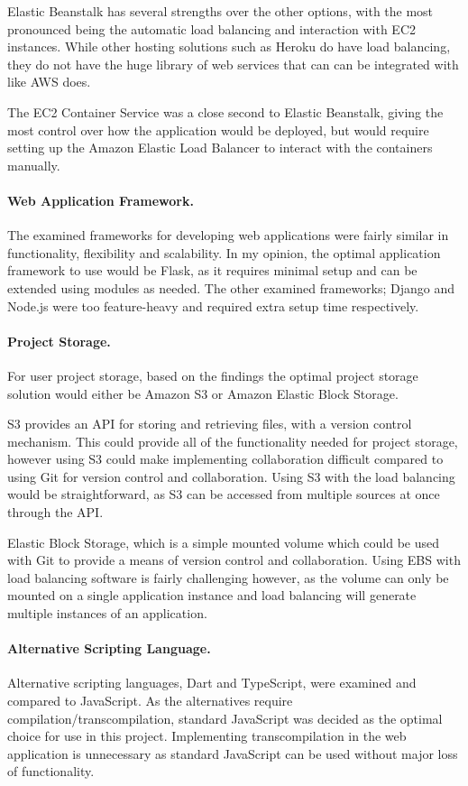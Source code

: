 Elastic Beanstalk has several strengths over the other options, with the most pronounced being the automatic load balancing and interaction with EC2 instances. While other hosting solutions such as Heroku do have load balancing, they do not have the huge library of web services that can can be integrated with like AWS does.

The EC2 Container Service was a close second to Elastic Beanstalk, giving the most control over how the application would be deployed, but would require setting up the Amazon Elastic Load Balancer to interact with the containers manually.

\paragraph{Web Application Framework.}
The examined frameworks for developing web applications were fairly similar in functionality, flexibility and scalability. In my opinion, the optimal application framework to use would be Flask, as it requires minimal setup and can be extended using modules as needed. The other examined frameworks; Django and Node.js were too feature-heavy and required extra setup time respectively.

\paragraph{Project Storage.}
For user project storage, based on the findings the optimal project storage solution would either be Amazon S3 or Amazon Elastic Block Storage.

S3 provides an API for storing and retrieving files, with a version control mechanism. This could provide all of the functionality needed for project storage, however using S3 could make implementing collaboration difficult compared to using Git for version control and collaboration. Using S3 with the load balancing would be straightforward, as S3 can be accessed from multiple sources at once through the API.

Elastic Block Storage, which is a simple mounted volume which could be used with Git to provide a means of version control and collaboration. Using EBS with load balancing software is fairly challenging however, as the volume can only be mounted on a single application instance and load balancing will generate multiple instances of an application.

\paragraph{Alternative Scripting Language.}
Alternative scripting languages, Dart and TypeScript, were examined and compared to JavaScript. As the alternatives require compilation/transcompilation, standard JavaScript was decided as the optimal choice for use in this project. Implementing transcompilation in the web application is unnecessary as standard JavaScript can be used without major loss of functionality.

